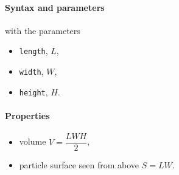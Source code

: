 \begin{figure}[h]
\hfill
{}
\hfill
{}
\hfill
\end{figure}

\paragraph{Syntax and parameters}
\begin{quote}
\end{quote}
with the parameters
\begin{itemize}
\item \texttt{length}, $L$, 
\item \texttt{width}, $W$, 
\item \texttt{height}, $H$. 
\end{itemize}

\paragraph{Properties}
\begin{itemize}
\item volume $V = \dfrac{L W H}{2} $,
\item particle surface seen from above $S = L W$.
\end{itemize}

